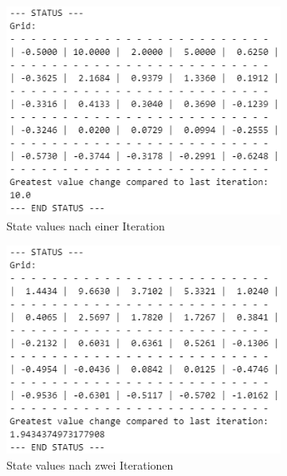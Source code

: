 \documentclass[11pt]{article}
\begin{document}
\begin{figure}
    \centering
    \begin{subfigure}[b]{0.49\textwidth}
        \centering
        \includegraphics[width=\textwidth]{img/img_2_1_a_it1.png}
        \caption{State values nach einer Iteration}
        \label{img:2_1_a2_it1}
    \end{subfigure}
    \hfill
    \begin{subfigure}[b]{0.49\textwidth}
        \centering
        \includegraphics[width=\textwidth]{img/img_2_1_a_it2.png}
        \caption{State values nach zwei Iterationen}
        \label{img:2_1_a2_it2}
    \end{subfigure}
    \hfill
    \begin{subfigure}[b]{0.49\textwidth}

\end{subfigure}
\end{figure}
\end{document}
